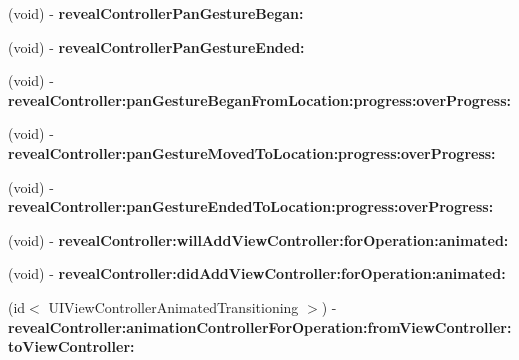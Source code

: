 \begin{DoxyCompactItemize}
\mbox{\label{protocol_s_w_reveal_view_controller_delegate-p_a96f5443d41b614fdd8b5cac04dbc7e64}} 
(void) -\/ {\bfseries reveal\+Controller\+Pan\+Gesture\+Began\+:}
\item 
\mbox{\label{protocol_s_w_reveal_view_controller_delegate-p_a556cb9285d0c93f4f67b01cdb657563e}} 
(void) -\/ {\bfseries reveal\+Controller\+Pan\+Gesture\+Ended\+:}
\item 
\mbox{\label{protocol_s_w_reveal_view_controller_delegate-p_a3f209b298bdd9504c8c037e43fd24de7}} 
(void) -\/ {\bfseries reveal\+Controller\+:pan\+Gesture\+Began\+From\+Location\+:progress\+:over\+Progress\+:}
\item 
\mbox{\label{protocol_s_w_reveal_view_controller_delegate-p_a821df78bf7cbc8f166a300ac5e4d7fe2}} 
(void) -\/ {\bfseries reveal\+Controller\+:pan\+Gesture\+Moved\+To\+Location\+:progress\+:over\+Progress\+:}
\item 
\mbox{\label{protocol_s_w_reveal_view_controller_delegate-p_a15699beb33faf62010d5aa0e5ddcac0e}} 
(void) -\/ {\bfseries reveal\+Controller\+:pan\+Gesture\+Ended\+To\+Location\+:progress\+:over\+Progress\+:}
\item 
\mbox{\label{protocol_s_w_reveal_view_controller_delegate-p_aa942e8972eaa2f659e1c2dbedc58a9f1}} 
(void) -\/ {\bfseries reveal\+Controller\+:will\+Add\+View\+Controller\+:for\+Operation\+:animated\+:}
\item 
\mbox{\label{protocol_s_w_reveal_view_controller_delegate-p_a68a038044cbf58bf6c9e315c4a11e22a}} 
(void) -\/ {\bfseries reveal\+Controller\+:did\+Add\+View\+Controller\+:for\+Operation\+:animated\+:}
\item 
\mbox{\label{protocol_s_w_reveal_view_controller_delegate-p_a5b1d86786e3cf70fa3a30f179ab8b269}} 
(id$<$ U\+I\+View\+Controller\+Animated\+Transitioning $>$) -\/ {\bfseries reveal\+Controller\+:animation\+Controller\+For\+Operation\+:from\+View\+Controller\+:to\+View\+Controller\+:}

\end{DoxyCompactItemize}
